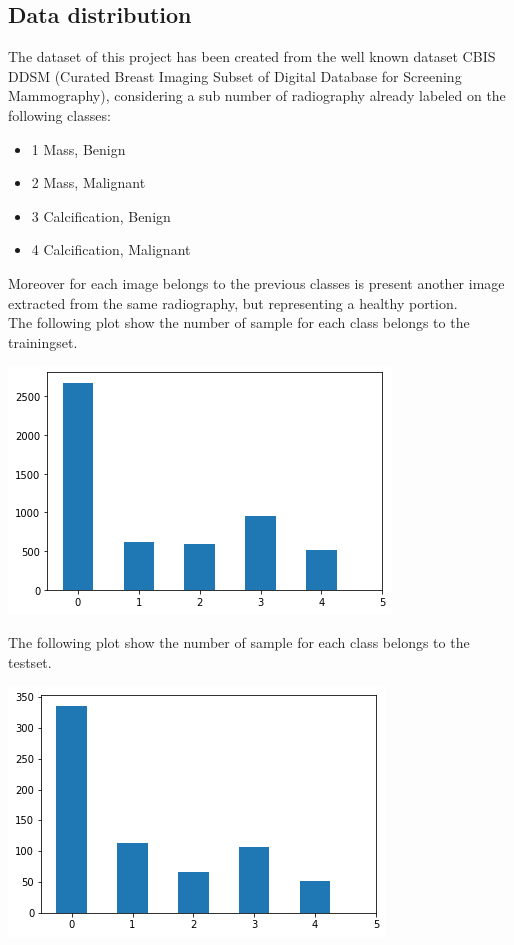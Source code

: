 \documentclass{article}
\begin{document}
\subsection{Data distribution}
The dataset of this project has been created from the well known dataset CBIS DDSM (Curated Breast Imaging Subset of Digital Database for Screening Mammography), considering a sub number of radiography already labeled on the following classes:
\begin{itemize}
\item 1 Mass, Benign 
\item 2 Mass, Malignant
\item 3 Calcification, Benign
\item 4 Calcification, Malignant
\end{itemize}
Moreover for each image belongs to the previous classes is present another image extracted from the same radiography, but representing a healthy portion.\\
The following plot show the number of sample for each class belongs to the trainingset.\\
\begin{minipage}{\linewidth}
\begin{center}
\vspace{3mm}
\includegraphics[scale=0.6]{./img/distribution1.png} 
\vspace{3mm}
\end{center}
\end{minipage}
The following plot show the number of sample for each class belongs to the testset.\\
\begin{minipage}{\linewidth}
\begin{center}
\vspace{3mm}
\includegraphics[scale=0.6]{./img/distribution2.png} 
\vspace{3mm}
\end{center}
\end{minipage}
\end{document}
